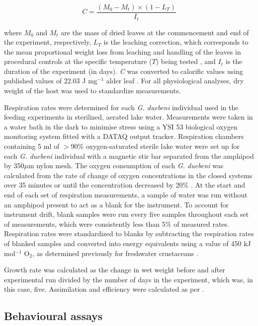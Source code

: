 \begin{equation}
C=  \frac{(M_0-M_t)\times(1-L_T)}{I_t}
\end{equation}

where $M_0$ and $M_t$ are the mass of dried leaves at the commencement and end of the experiment, respectively, $L_T$ is the leaching correction, which corresponds to the mean proportional weight loss from leaching and handling of the leaves in procedural controls at the specific temperature ($T$) being tested \cite{nilsson1974}, and $I_t$ is the duration of the experiment (in days). \emph{C} was converted to calorific values using published values of 22.03 J mg$^{-1}$  alder leaf \cite{adcock1982}. For all physiological analyses, dry weight of the host was used to standardize measurements. 

Respiration rates were determined for each \emph{G. duebeni} individual used in the feeding experiments in sterilized, aerated lake water. Measurements were taken in a water bath in the dark to minimise stress using a YSI 53 biological oxygen monitoring system fitted with a DATAQ output tracker. Respiration chambers containing 5 ml of  $>$90\% oxygen-saturated sterile lake water were set up for each \emph{G. duebeni} individual with a magnetic stir bar separated from the amphipod by 350$\mu$m nylon mesh. The oxygen consumption of each \emph{G. duebeni} was calculated from the rate of change of oxygen concentrations in the closed systems over 35 minutes or until the concentration decreased by 20\% \cite{penk2016}. At the start and end of each set of respiration measurements, a sample of water was run without an amphipod present to act as a blank for the instrument. To account for instrument drift, blank samples were run every five samples throughout each set of measurements, which were consistently less than 5\% of measured rates. Respiration rates were standardized to blanks by subtracting the respiration rates of blanked samples and converted into energy equivalents using a value of 450 kJ mol$^{-1}$ O$_2$, as determined previously for freshwater crustaceans \cite{gnaiger1983}. 

Growth rate was calculated as the change in wet weight before and after experimental run divided by the number of days in the experiment, which was, in this case, five. Assimilation and efficiency were calculated as per \citet{nilsson1974}. 

\subsection{Behavioural assays}

